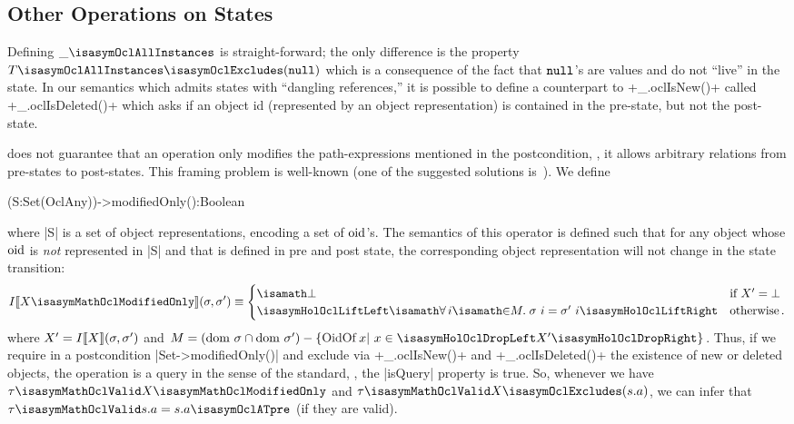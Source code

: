 \subsection{Other Operations on States}
Defining $\_\isasymOclAllInstances$
is straight-forward; the only difference is the property
$T\isasymOclAllInstances\isasymOclExcludes(\isasymOclNull)$ which is a
consequence of the fact that ${\mathtt{null}_\text{{}}}$'s are values and do not ``live'' in the
state.  In our semantics which admits states with ``dangling references,'' it is
possible to define a counterpart to \inlineocl+_.oclIsNew()+ called
\inlineocl+_.oclIsDeleted()+ which asks if an object id (represented by an object
representation) is contained in the pre-state, but not the post-state.

\OCL does not guarantee that an operation only modifies the path-expressions
mentioned in the postcondition, \ie, it allows arbitrary relations from
pre-states to post-states.  This framing problem is well-known (one of the
suggested solutions is~\cite{kosiuczenko:specification:2006}). We define
\begin{ocl}
 (S:Set(OclAny))->modifiedOnly():Boolean
\end{ocl}
where \inlineocl|S| is a set of object representations, encoding
a set of $\mathrm{oid}$'s. The semantics of this operator is defined such that
for any object whose $\mathrm{oid}$ is \emph{not }represented in \inlineocl|S|
and that is defined in pre and post state, the corresponding object representation will not change
in the state transition:
\begin{gather*}
I\semantics{X\isasymMathOclModifiedOnly} (\sigma, \sigma')  \equiv
  \begin{cases}
    \isasymbottom & \text{if $X' = \bottom$}  \\
     \lift{\isasymforall i \isasymin M\spot
        \sigma~i = \sigma'~i} & \text{otherwise}\mi{.}
   \end{cases}
\end{gather*}
where $X' = I\llbracket X \rrbracket (\sigma, \sigma')$ and $M=
(\dom~\sigma\cap\dom~\sigma') - \{ \HolOclOidOf x |~x \in\drop{X'}\}$.  Thus, if
we require in a postcondition \inlineocl|Set{}->modifiedOnly()| and exclude via
\inlineocl+_.oclIsNew()+ and \inlineocl+_.oclIsDeleted()+ the existence of new
or deleted objects, the operation is a query in the sense of the \OCL standard, \ie,
the \inlineocl|isQuery| property is true. So, whenever we have $ \tau
\isasymMathOclValid X\isasymMathOclModifiedOnly$ and $ \tau
\isasymMathOclValid X\isasymOclExcludes(s.a)$, we can infer that $\tau
\isasymMathOclValid s.a = s.a\isasymOclATpre$ (if they are valid).

